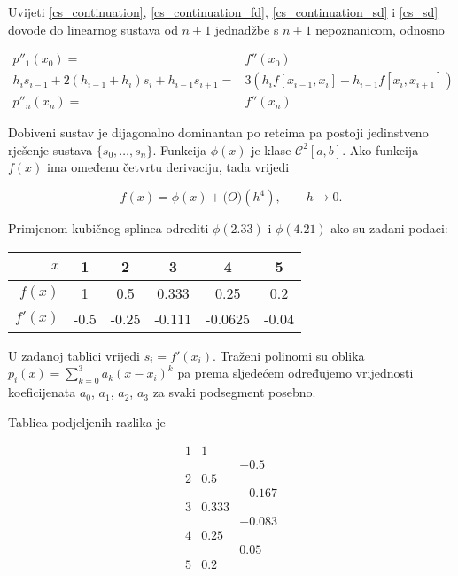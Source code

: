 Uvijeti \ref{cs_continuation}, \ref{cs_continuation_fd}, \ref{cs_continuation_sd} i \ref{cs_sd} dovode do linearnog sustava od $n+1$ jednadžbe s $n+1$ nepoznanicom, odnosno

\begin{align*}
p''_1(x_0) =& f''(x_0)\\
h_is_{i-1}+2(h_{i-1}+h_i)s_i+h_{i-1}s_{i+1}=&3(h_if[x_{i-1},x_i]+h_{i-1}f[x_i,x_{i+1}])\\
p''_n(x_n) =& f''(x_n)
\end{align*}

Dobiveni sustav je dijagonalno dominantan po retcima pa postoji jedinstveno rješenje sustava $\{s_0,\dots,s_n\}$. Funkcija $\phi(x)$ je klase $\mathcal{C}^2[a,b]$. Ako funkcija $f(x)$ ima omeđenu četvrtu derivaciju, tada vrijedi

$$
f(x)=\phi(x) + \mathcal(O)(h^4),\qquad h\to0.
$$

\newpage

\begin{examplebox}
    Primjenom kubičnog splinea odrediti $\phi(2.33)$ i $\phi(4.21)$ ako su zadani podaci:
    
    \center
    \begin{tabular}{r|c|c|c|c|c}
        $x$ & 1 & 2 & 3 & 4 & 5 \\
        \hline
        $f(x)$ & 1 & 0.5 & 0.333 & 0.25 & 0.2 \\
        \hline
        $f'(x)$ & -0.5 & -0.25 & -0.111 & -0.0625 & -0.04
    \end{tabular}
\end{examplebox}

U zadanoj tablici vrijedi $s_i=f'(x_i)$. Traženi polinomi su oblika $p_i(x)=\sum_{k=0}^3a_k(x-x_i)^k$ pa prema sljedećem određujemo vrijednosti koeficijenata $a_0$, $a_1$, $a_2$, $a_3$ za svaki podsegment posebno.

Tablica podjeljenih razlika je

$$
\begin{array}{ccc}
1&1&\\
&&-0.5\\
2&0.5\\
&&-0.167\\
3&0.333\\
&&-0.083\\
4&0.25\\
&&0.05\\
5&0.2\\
\end{array}
$$

